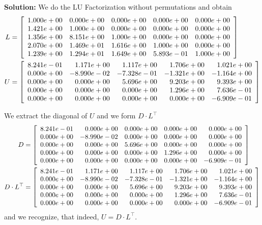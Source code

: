 \textbf{Solution:} We do the LU Factorization without permutations and obtain
\begin{align*}
    L&=\left[
\begin{array}{ccccc}
1.000e+00 & 0.000e+00 & 0.000e+00 & 0.000e+00 & 0.000e+00 \\
1.421e+00 & 1.000e+00 & 0.000e+00 & 0.000e+00 & 0.000e+00 \\
1.356e+00 & 8.151e+00 & 1.000e+00 & 0.000e+00 & 0.000e+00 \\
2.070e+00 & 1.469e+01 & 1.616e+00 & 1.000e+00 & 0.000e+00 \\
1.239e+00 & 1.294e+01 & 1.649e+00 & 5.893e-01 & 1.000e+00 \\
\end{array}
\right] \bigskip \\
U&=\left[
\begin{array}{rrrrr}
8.241e-01 & 1.171e+00 & 1.117e+00 & 1.706e+00 & 1.021e+00 \\
0.000e+00 & -8.990e-02 & -7.328e-01 & -1.321e+00 & -1.164e+00 \\
0.000e+00 & 0.000e+00 & 5.696e+00 & 9.203e+00 & 9.393e+00 \\
0.000e+00 & 0.000e+00 & 0.000e+00 & 1.296e+00 & 7.636e-01 \\
0.000e+00 & 0.000e+00 & 0.000e+00 & 0.000e+00 & -6.909e-01 \\
\end{array}
\right]
\end{align*}

We extract the diagonal of $U$ and we form $D \cdot L^\top$
\begin{align*}
    D &= \left[
\begin{array}{rrrrr}
8.241e-01 & 0.000e+00 & 0.000e+00 & 0.000e+00 & 0.000e+00 \\
0.000e+00 & -8.990e-02 & 0.000e+00 & 0.000e+00 & 0.000e+00 \\
0.000e+00 & 0.000e+00 & 5.696e+00 & 0.000e+00 & 0.000e+00 \\
0.000e+00 & 0.000e+00 & 0.000e+00 & 1.296e+00 & 0.000e+00 \\
0.000e+00 & 0.000e+00 & 0.000e+00 & 0.000e+00 & -6.909e-01 \\
\end{array}
\right] \bigskip \\
D \cdot L^\top & = \left[
\begin{array}{rrrrr}
8.241e-01 & 1.171e+00 & 1.117e+00 & 1.706e+00 & 1.021e+00 \\
0.000e+00 & -8.990e-02 & -7.328e-01 & -1.321e+00 & -1.164e+00 \\
0.000e+00 & 0.000e+00 & 5.696e+00 & 9.203e+00 & 9.393e+00 \\
0.000e+00 & 0.000e+00 & 0.000e+00 & 1.296e+00 & 7.636e-01 \\
0.000e+00 & 0.000e+00 & 0.000e+00 & 0.000e+00 & -6.909e-01 \\
\end{array}
\right]
\end{align*}
and we recognize, that indeed, $U = D \cdot L^\top$.\\

